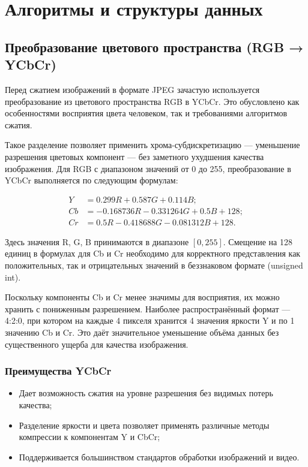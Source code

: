 \section{Алгоритмы и структуры данных}
\subsection{Преобразование цветового пространства (RGB → YCbCr)}

Перед сжатием изображений в формате JPEG зачастую используется преобразование из цветового пространства RGB в YCbCr. 
Это обусловлено как особенностями восприятия цвета человеком, так и требованиями алгоритмов сжатия.


Такое разделение позволяет применить хрома-субдискретизацию — уменьшение разрешения цветовых компонент — без заметного ухудшения качества изображения.
Для RGB с диапазоном значений от 0 до 255, преобразование в YCbCr выполняется по следующим формулам:


\begin{equation}
    \begin{aligned}
        Y &= 0.299R + 0.587G + 0.114B; \\
        Cb &= -0.168736R - 0.331264G + 0.5B + 128; \\
        Cr &= 0.5R - 0.418688G - 0.081312B + 128.
    \end{aligned}
\end{equation}


Здесь значения R, G, B принимаются в диапазоне $[0, 255]$. 
Смещение на 128 единиц в формулах для Cb и Cr необходимо для корректного представления как положительных, так и отрицательных значений в беззнаковом формате (unsigned int).

Поскольку компоненты Cb и Cr менее значимы для восприятия, их можно хранить с пониженным разрешением. 
Наиболее распространённый формат — 4:2:0, при котором на каждые 4 пикселя хранится 4 значения яркости Y и по 1 значению Cb и Cr. 
Это даёт значительное уменьшение объёма данных без существенного ущерба для качества изображения.



\subsubsection{Преимущества YCbCr}
    \begin{itemize}
        \item Дает возможность сжатия на уровне разрешения без видимых потерь качества;
        \item Разделение яркости и цвета позволяет применять различные методы компрессии к компонентам Y и CbCr;
        \item Поддерживается большинством стандартов обработки изображений и видео.
    \end{itemize}

